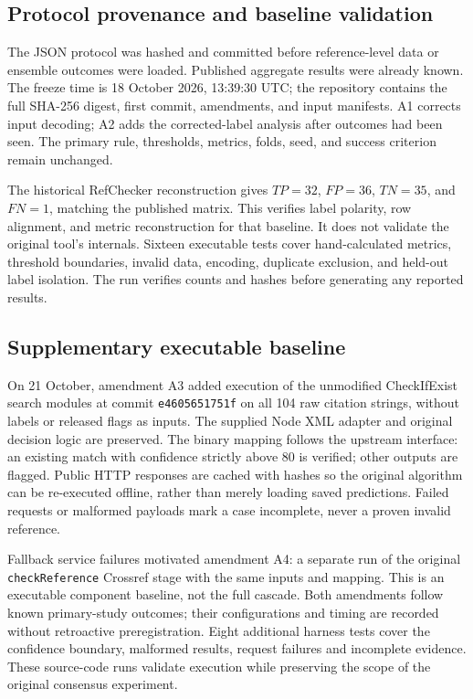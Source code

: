\documentclass[acmsmall,screen,nonacm]{acmart}
\begin{document}
\subsection{Protocol provenance and baseline validation}
The JSON protocol was hashed and committed before reference-level data or ensemble outcomes were loaded. Published aggregate results were already known. The freeze time is 18 October 2026, 13:39:30 UTC; the repository contains the full SHA-256 digest, first commit, amendments, and input manifests. A1 corrects input decoding; A2 adds the corrected-label analysis after outcomes had been seen. The primary rule, thresholds, metrics, folds, seed, and success criterion remain unchanged.

The historical RefChecker reconstruction gives $TP=32$, $FP=36$, $TN=35$, and $FN=1$, matching the published matrix. This verifies label polarity, row alignment, and metric reconstruction for that baseline. It does not validate the original tool's internals. Sixteen executable tests cover hand-calculated metrics, threshold boundaries, invalid data, encoding, duplicate exclusion, and held-out label isolation. The run verifies counts and hashes before generating any reported results.

\subsection{Supplementary executable baseline}
On 21 October, amendment A3 added execution of the unmodified CheckIfExist search modules at commit \texttt{e4605651751f} on all 104 raw citation strings, without labels or released flags as inputs. The supplied Node XML adapter and original decision logic are preserved. The binary mapping follows the upstream interface: an existing match with confidence strictly above 80 is verified; other outputs are flagged. Public HTTP responses are cached with hashes so the original algorithm can be re-executed offline, rather than merely loading saved predictions. Failed requests or malformed payloads mark a case incomplete, never a proven invalid reference.

Fallback service failures motivated amendment A4: a separate run of the original \texttt{checkReference} Crossref stage with the same inputs and mapping. This is an executable component baseline, not the full cascade. Both amendments follow known primary-study outcomes; their configurations and timing are recorded without retroactive preregistration. Eight additional harness tests cover the confidence boundary, malformed results, request failures and incomplete evidence. These source-code runs validate execution while preserving the scope of the original consensus experiment.
\end{document}
